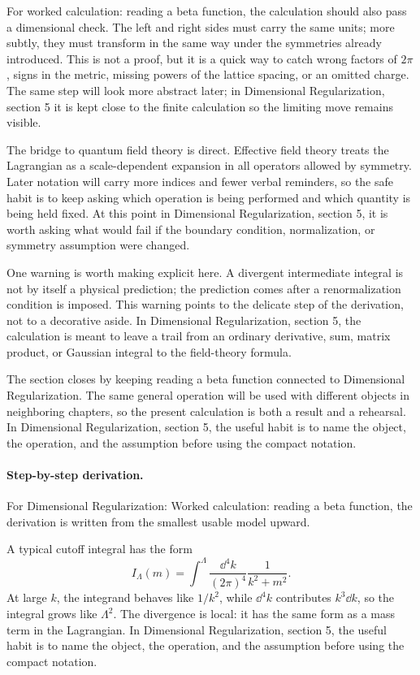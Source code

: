 For worked calculation: reading a beta function, the calculation should also pass a dimensional check.  The left and right sides must carry the same units; more subtly, they must transform in the same way under the symmetries already introduced.  This is not a proof, but it is a quick way to catch wrong factors of \(2\pi\), signs in the metric, missing powers of the lattice spacing, or an omitted charge.  The same step will look more abstract later; in Dimensional Regularization, section 5 it is kept close to the finite calculation so the limiting move remains visible.

The bridge to quantum field theory is direct.  Effective field theory treats the Lagrangian as a scale-dependent expansion in all operators allowed by symmetry.  Later notation will carry more indices and fewer verbal reminders, so the safe habit is to keep asking which operation is being performed and which quantity is being held fixed.  At this point in Dimensional Regularization, section 5, it is worth asking what would fail if the boundary condition, normalization, or symmetry assumption were changed.

One warning is worth making explicit here.  A divergent intermediate integral is not by itself a physical prediction; the prediction comes after a renormalization condition is imposed.  This warning points to the delicate step of the derivation, not to a decorative aside.  In Dimensional Regularization, section 5, the calculation is meant to leave a trail from an ordinary derivative, sum, matrix product, or Gaussian integral to the field-theory formula.

The section closes by keeping reading a beta function connected to Dimensional Regularization.  The same general operation will be used with different objects in neighboring chapters, so the present calculation is both a result and a rehearsal.  In Dimensional Regularization, section 5, the useful habit is to name the object, the operation, and the assumption before using the compact notation.



\paragraph{Step-by-step derivation.}

For Dimensional Regularization: Worked calculation: reading a beta function, the derivation is written from the smallest usable model upward.

A typical cutoff integral has the form
\[
  I_\Lambda(m)=\int^{\Lambda}\frac{\dd^4k}{(2\pi)^4}\frac{1}{k^2+m^2}.
\]
At large \(k\), the integrand behaves like \(1/k^2\), while \(\dd^4k\) contributes \(k^3\dd k\), so the integral grows like \(\Lambda^2\).  The divergence is local: it has the same form as a mass term in the Lagrangian.  In Dimensional Regularization, section 5, the useful habit is to name the object, the operation, and the assumption before using the compact notation.

